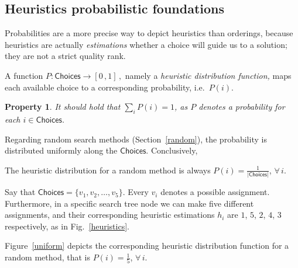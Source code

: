 \documentclass{ws-ijait}
\newtheorem{property}{Property}
\begin{document}
%

\subsection{Heuristics probabilistic foundations}

Probabilities are a more precise way to depict heuristics
than orderings, because heuristics are actually
\emph{estimations} whether a choice will guide us to a
solution; they are not a strict quality rank.

\begin{definition}
  \label{hdf}
  A function $P: \mathsf{Choices} \to [0 \, , 1]\,,$ namely
  a \emph{heuristic distribution function,} maps each
  available choice to a corresponding probability, i.e.\ 
  $P(i)$.
\end{definition}
\begin{property}
  It should hold that $\sum_i P(i) = 1$, as $P$ denotes a
  probability for each $i \in \mathsf{Choices}$.
\end{property}
Regarding random search methods (Section~\ref{random}), the
probability is distributed uniformly along the
$\mathsf{Choices}$. Conclusively,
\begin{proposition}
  \label{probability-random}
  The heuristic distribution for a random method is always
  $P(i) = \frac{1}{|\mathsf{Choices}|}$, $\forall \, i$.
\end{proposition}
\begin{example}
  \label{distribution}
  Say that $\mathsf{Choices} = \{v_1, v_2, \ldots, v_5\}$.
  Every $v_i$ denotes a possible assignment. Furthermore, in
  a specific search tree node we can make five different
  assignments, and their corresponding heuristic estimations
  $h_i$ are $1$, $5$, $2$, $4$, $3$ respectively, as in
  Fig.~\ref{heuristics}.

  Figure~\ref{uniform} depicts the corresponding heuristic
  distribution function for a random method, that is $P(i) =
  \frac{1}{5}$, $\forall \, i$.
\end{example}
\end{document}
